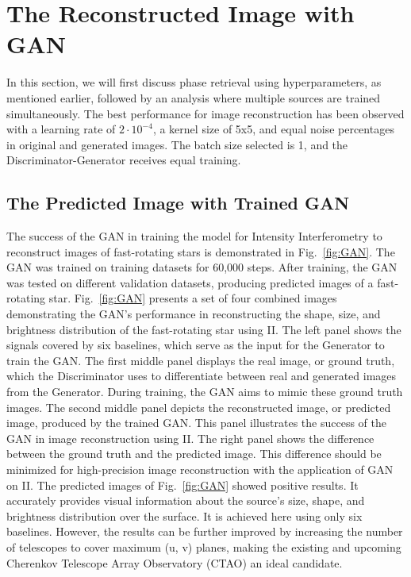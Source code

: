\section{The Reconstructed Image with GAN}

In this section, we will first discuss phase retrieval using hyperparameters, as mentioned earlier, followed by an analysis where multiple sources are trained simultaneously. The best performance for image reconstruction has been observed with a learning rate of $2 \cdot 10^{-4}$, a kernel size of 5x5, and equal noise percentages in original and generated images. The batch size selected is 1, and the Discriminator-Generator receives equal training.

\subsection{The Predicted Image with Trained GAN}
The success of the GAN in training the model for Intensity Interferometry to reconstruct images of fast-rotating stars is demonstrated in Fig.~\ref{fig:GAN}. The GAN was trained on training datasets for 60,000 steps. After training, the GAN was tested on different validation datasets, producing predicted images of a fast-rotating star. Fig.~\ref{fig:GAN} presents a set of four combined images demonstrating the GAN's performance in reconstructing the shape, size, and brightness distribution of the fast-rotating star using II. The left panel shows the signals covered by six baselines, which serve as the input for the Generator to train the GAN. The first middle panel displays the real image, or ground truth, which the Discriminator uses to differentiate between real and generated images from the Generator. During training, the GAN aims to mimic these ground truth images. The second middle panel depicts the reconstructed image, or predicted image, produced by the trained GAN. This panel illustrates the success of the GAN in image reconstruction using II. The right panel shows the difference between the ground truth and the predicted image. This difference should be minimized for high-precision image reconstruction with the application of GAN on II. The predicted images of Fig.~\ref{fig:GAN} showed positive results. It accurately provides visual information about the source's size, shape, and brightness distribution over the surface. It is achieved here using only six baselines. However, the results can be further improved by increasing the number of telescopes to cover maximum (u, v) planes, making the existing and upcoming Cherenkov Telescope Array Observatory (CTAO) an ideal candidate. 

